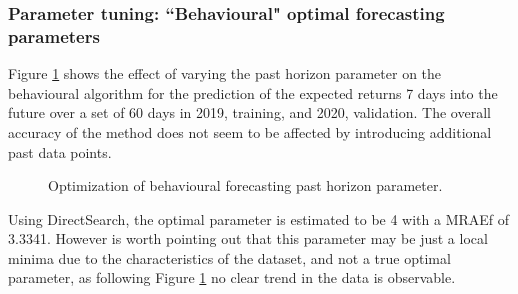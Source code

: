 \subsubsection{Parameter tuning: ``Behavioural" optimal forecasting parameters}
Figure \ref{fig:ch5_BF_forecast_optimization_60} shows the effect of varying the past horizon parameter on the behavioural algorithm for the prediction of the expected returns 7 days into the future over a set of 60 days in 2019, training, and 2020, validation. The overall accuracy of the method does not seem to be affected by introducing additional past data points. 

\begin{figure}[ht!]
    \centering
    
    \caption{Optimization of behavioural forecasting past horizon parameter.}
    \label{fig:ch5_BF_forecast_optimization_60}
\end{figure}

Using DirectSearch\cite{DirectSearch.jl}, the optimal parameter is estimated to be 4 with a \ac{MRAE}f of 3.3341. However is worth pointing out that this parameter may be just a local minima due to the characteristics of the dataset, and not a true optimal parameter, as following Figure \ref{fig:ch5_BF_forecast_optimization_60} no clear trend in the data is observable.



